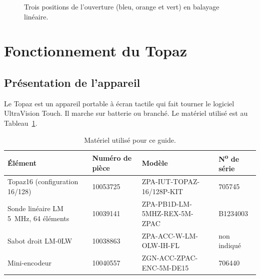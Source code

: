 \documentclass[11pt,letterpaper]{article}
\begin{document}
\begin{figure}[H]
\centering
{}
\caption{Trois positions de l'ouverture (bleu, orange et vert) en balayage lin\'eaire.}
\label{fig:e-scan}
\end{figure}

\section{Fonctionnement du Topaz}

\subsection{Pr\'esentation de l'appareil}

Le Topaz est un appareil portable \`a \'ecran tactile qui fait tourner le logiciel UltraVision Touch. Il marche sur batterie ou branch\'e. Le mat\'eriel utilis\'e est au Tableau~\ref{tab:materiel}.

\begin{table}[H]
\centering
\caption{Mat\'eriel utilis\'e pour ce guide.}
\label{tab:materiel}
\small
\begin{tabular}{p{5.6cm}llp{1.7cm}}
\toprule
\'El\'ement & Num\'ero de pi\`ece & Mod\`ele & N\textsuperscript{o} de s\'erie \\
\midrule
Topaz16 (configuration 16/128) & 10053725 & ZPA-IUT-TOPAZ-16/128P-KIT & 705745 \\
Sonde lin\'eaire LM 5~MHz, 64 \'el\'ements & 10039141 & ZPA-PB1D-LM-5MHZ-REX-5M-ZPAC & B1234003 \\
Sabot droit LM-0LW & 10038863 & ZPA-ACC-W-LM-OLW-IH-FL & non indiqu\'e \\
Mini-encodeur & 10040557 & ZGN-ACC-ZPAC-ENC-5M-DE15 & 706440 \\
\bottomrule
\end{tabular}
\end{table}
\end{document}

